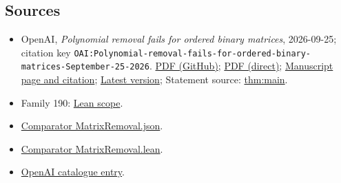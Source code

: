 \documentclass[11pt]{article}
\begin{document}
\subsection{Sources}
\begin{itemize}
\item OpenAI, \emph{Polynomial removal fails for ordered binary matrices}, 2026-09-25; citation key \texttt{OAI:Polynomial-removal-fails-for-ordered-binary-matrices-September-25-2026}. \href{https://github.com/openai/math/blob/adc7f1241b42e322a6451854ab7e4b4c146bf78a/preprints/Polynomial-removal-fails-for-ordered-binary-matrices-September-25-2026/paper.pdf}{PDF (GitHub)}; \href{https://github.com/openai/math/raw/adc7f1241b42e322a6451854ab7e4b4c146bf78a/preprints/Polynomial-removal-fails-for-ordered-binary-matrices-September-25-2026/paper.pdf}{PDF (direct)}; \href{https://github.com/openai/math/blob/adc7f1241b42e322a6451854ab7e4b4c146bf78a/preprints/Polynomial-removal-fails-for-ordered-binary-matrices-September-25-2026/README.md}{Manuscript page and citation}; \href{https://github.com/openai/math/blob/main/preprints/Polynomial-removal-fails-for-ordered-binary-matrices-September-25-2026/paper.pdf}{Latest version}; Statement source: \href{https://github.com/openai/math/blob/adc7f1241b42e322a6451854ab7e4b4c146bf78a/preprints/Polynomial-removal-fails-for-ordered-binary-matrices-September-25-2026/build/sections/01-introduction.tex\#L33}{thm:main}.
\item Family 190: \href{https://github.com/openai/math/blob/adc7f1241b42e322a6451854ab7e4b4c146bf78a/lean/docs/190.md}{Lean scope}.
\item \href{https://github.com/openai/math/blob/adc7f1241b42e322a6451854ab7e4b4c146bf78a/lean/ComparatorChallenges/MatrixRemoval.json}{Comparator MatrixRemoval.json}.
\item \href{https://github.com/openai/math/blob/adc7f1241b42e322a6451854ab7e4b4c146bf78a/lean/ComparatorChallenges/MatrixRemoval.lean}{Comparator MatrixRemoval.lean}.
\item \href{https://github.com/openai/math/blob/adc7f1241b42e322a6451854ab7e4b4c146bf78a/CONTENTS.md}{OpenAI catalogue entry}.
\end{itemize}
\end{document}
